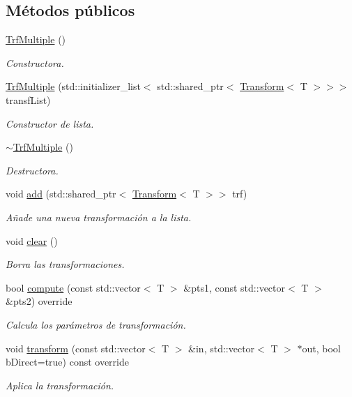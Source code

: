 \subsection*{Métodos públicos}
\begin{DoxyCompactItemize}
\item 
\hyperlink{class_i3_d_1_1_trf_multiple_a30d9f42f909ca7cf936845acef6d6fdf}{Trf\+Multiple} ()
\begin{DoxyCompactList}\small\item\em Constructora. \end{DoxyCompactList}\item 
\hyperlink{class_i3_d_1_1_trf_multiple_a587edd2f69bff8f145c79c8934dc2895}{Trf\+Multiple} (std\+::initializer\+\_\+list$<$ std\+::shared\+\_\+ptr$<$ \hyperlink{class_i3_d_1_1_transform}{Transform}$<$ T $>$$>$$>$ transf\+List)
\begin{DoxyCompactList}\small\item\em Constructor de lista. \end{DoxyCompactList}\item 
\hyperlink{class_i3_d_1_1_trf_multiple_a474109b2a2b9040288139f28b3a0af6b}{$\sim$\+Trf\+Multiple} ()
\begin{DoxyCompactList}\small\item\em Destructora. \end{DoxyCompactList}\item 
void \hyperlink{class_i3_d_1_1_trf_multiple_a214c54fe571166735d0fda5f2a827642}{add} (std\+::shared\+\_\+ptr$<$ \hyperlink{class_i3_d_1_1_transform}{Transform}$<$ T $>$$>$ trf)
\begin{DoxyCompactList}\small\item\em Añade una nueva transformación a la lista. \end{DoxyCompactList}\item 
void \hyperlink{class_i3_d_1_1_trf_multiple_ab7cd324176621b83076f1a3db881c6ca}{clear} ()
\begin{DoxyCompactList}\small\item\em Borra las transformaciones. \end{DoxyCompactList}\item 
bool \hyperlink{group__trf_group_ga30e6b58e89d4ad3657e1b6a74edc22cc}{compute} (const std\+::vector$<$ T $>$ \&pts1, const std\+::vector$<$ T $>$ \&pts2) override
\begin{DoxyCompactList}\small\item\em Calcula los parámetros de transformación. \end{DoxyCompactList}\item 
void \hyperlink{group__trf_group_gad8eb1ca9e9b9c6e6d30f1f1b15dee818}{transform} (const std\+::vector$<$ T $>$ \&in, std\+::vector$<$ T $>$ $\ast$out, bool b\+Direct=true) const  override
\begin{DoxyCompactList}\small\item\em Aplica la transformación. \end{DoxyCompactList}\end{DoxyCompactItemize}
